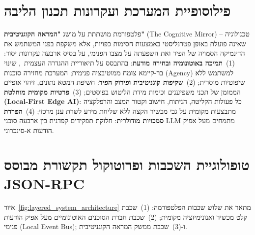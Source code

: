 \section{פילוסופיית המערכת ועקרונות תכנון הליבה}
\label{sec:arch_detailed_philosophy}
פלטפורמת \projectname{} מושתתת על מושג \textbf{"המראה הקוגניטיבית"} (\textenglish{The Cognitive Mirror}) -- טכנולוגיה שאינה פועלת באופן פטרנליסטי באמצעות חסימות כפויות, אלא משקפת בפני המשתמש את הדינמיקה הסמויה של הפיד ואת השפעתה על מצבו הפנימי, על בסיס ארבעה עקרונות יסוד:
(1)~\textbf{תמיכה באוטונומיה ובחירה מודעת}: בהתבסס על תיאוריית ההגדרה העצמית~\cite{ryan2000self}, שינוי בר-קיימא צומח ממוטיבציה פנימית; המערכת מחזירה סוכנות (\textenglish{Agency}) למשתמש ללא שיפוטיות מוסרית;
(2)~\textbf{שקיפות קוגניטיבית ופירוק הפיד}: חשיפת המטא-נתונים, זיהוי אופיים הממומן של תכני משפיענים וכימות מידת הליטוש בפוסטים;
(3)~\textbf{פרטיות מקומית מוחלטת (\textenglish{Local-First Edge AI})}: כל פעולות הקליטה, הניתוח, חישוב וקטור המצב והרפלקציה מתבצעות מקומית על גבי מכשיר הקצה ללא שליחת מידע לשרת ענן מרכזי;
(4)~\textbf{הפרדת סמכויות מודולרית}: חלוקת תפקידים קפדנית בין ארבעה סוכני \textenglish{LLM} מתמחים מעל אפיק הודעות א-סינכרוני.

\section{טופולוגיית השכבות ופרוטוקול תקשורת מבוסס JSON-RPC}
\label{sec:arch_layers_topology}
איור~\ref{fig:layered_system_architecture} מתאר את שלוש שכבות הפלטפורמה: (1)~שכבת קלט מכשיר ואנונימיזציה מקומית; (2)~שכבת חברת הסוכנים האוטונומיים מעל אפיק הודעות פנימי (\textenglish{Local Event Bus}); ו-(3)~שכבת ממשק המראה הקוגניטיבית.

